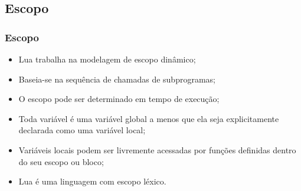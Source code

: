 \documentclass{beamer}
\begin{document}
\subsection{Escopo}
\begin{frame}[fragile]
\frametitle{Escopo}
	\begin{itemize}
	\item<1-> Lua trabalha na modelagem de escopo dinâmico; 
	\item<2-> Baseia-se na sequência de chamadas de subprogramas;
	\item<3-> O escopo pode ser determinado em tempo de execução;
	\item<4-> Toda variável é uma variável global a menos que ela seja explicitamente declarada como uma variável local;
	\item<5-> Variáveis locais podem ser livremente acessadas por funções definidas dentro do seu escopo ou bloco;
	\item<6-> Lua é uma linguagem com escopo léxico.
	\end{itemize}
\end{frame}
\end{document}
